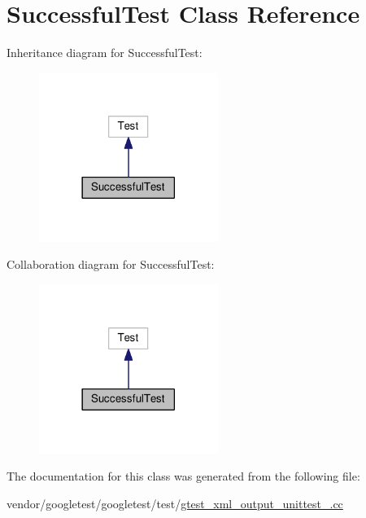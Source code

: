 \hypertarget{classSuccessfulTest}{}\section{Successful\+Test Class Reference}
\label{classSuccessfulTest}


Inheritance diagram for Successful\+Test\+:
\nopagebreak
\begin{figure}[H]
\begin{center}
\leavevmode
\includegraphics[width=165pt]{classSuccessfulTest__inherit__graph}
\end{center}
\end{figure}


Collaboration diagram for Successful\+Test\+:
\nopagebreak
\begin{figure}[H]
\begin{center}
\leavevmode
\includegraphics[width=165pt]{classSuccessfulTest__coll__graph}
\end{center}
\end{figure}


The documentation for this class was generated from the following file\+:\begin{DoxyCompactItemize}
\item 
vendor/googletest/googletest/test/\hyperlink{gtest__xml__output__unittest___8cc}{gtest\+\_\+xml\+\_\+output\+\_\+unittest\+\_\+.\+cc}\end{DoxyCompactItemize}
